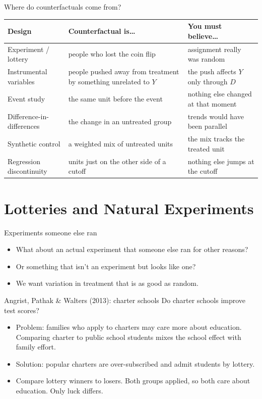 \documentclass[aspectratio=169,11pt]{beamer}
\begin{document}
\begin{frame}{Where do counterfactuals come from?}
\small
\begin{tabularx}{\textwidth}{>{\raggedright}p{2.6cm}>{\raggedright}X>{\raggedright\arraybackslash}X}
\toprule
Design & Counterfactual is\ldots & You must believe\ldots \\
\midrule
Experiment / lottery & people who lost the coin flip & assignment really was random \\
Instrumental variables & people pushed away from treatment by something unrelated to $Y$ & the push affects $Y$ only through $D$ \\
Event study & the same unit before the event & nothing else changed at that moment \\
Difference-in-differences & the change in an untreated group & trends would have been parallel \\
Synthetic control & a weighted mix of untreated units & the mix tracks the treated unit \\
Regression discontinuity & units just on the other side of a cutoff & nothing else jumps at the cutoff \\
\bottomrule
\end{tabularx}
\end{frame}


\section{Lotteries and Natural Experiments}

\begin{frame}{Experiments someone else ran}
\begin{itemize}
	\item What about an \alert{actual experiment} that someone else ran for other reasons?
	\item Or something that isn't an experiment but \alert{looks like one}?
	\item We want variation in treatment that is \alert{as good as random}.
\end{itemize}
\end{frame}


\begin{frame}{Angrist, Pathak \& Walters (2013): charter schools}
Do charter schools improve test scores?
\begin{itemize}
	\item \alert{Problem}: families who apply to charters may care more about education. Comparing charter to public school students mixes the school effect with family effort.
	\item \alert{Solution}: popular charters are over-subscribed and admit students by \alert{lottery}.
	\item Compare lottery \alert{winners} to \alert{losers}. Both groups applied, so both care about education. Only luck differs.
\end{itemize}
\end{frame}
\end{document}
